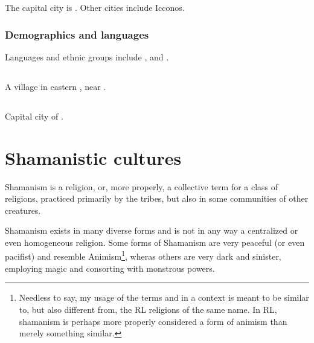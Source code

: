 The capital city is . 
Other cities include Icconos. 





\subsubsection{Demographics and languages}
Languages and ethnic groups include \Tepharin, \Samurin{} and \Ortic. 









\subsection{\Bryndwin}
\index{\Bryndwin}
A village in eastern \Scyrum, near . 









\subsection[Pylandos]{\Pylandos}
\index{\Pylandos}
Capital city of \Scyrum. 















\section{Shamanistic cultures}
Shamanism is a religion, or, more properly, a collective term for a class of religions, practiced primarily by the \meccaran{} tribes, but also in some communities of other creatures. %

Shamanism exists in many diverse forms and is not in any way a centralized or even homogeneous religion. Some forms of Shamanism are very peaceful (or even pacifist) and resemble Animism\footnote{Needless to say, my usage of the terms  and  in a \Miithian{} context is meant to be similar to, but also different from, the RL religions of the same name. In RL, shamanism is perhaps more properly considered a form of animism than merely something similar.}, wheras others are very dark and sinister, employing  magic and consorting with monstrous powers. 

